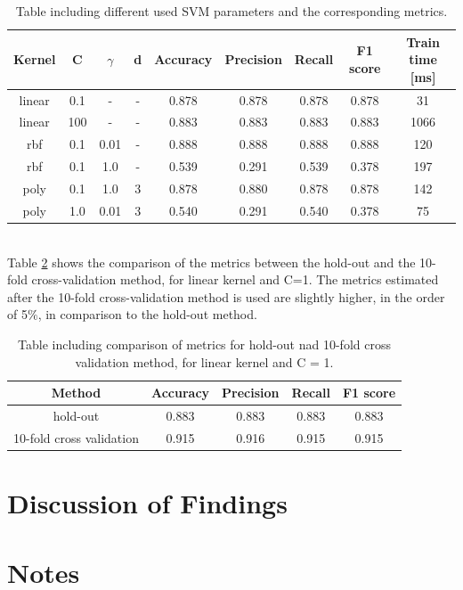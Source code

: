 \documentclass{article}
\begin{document}
\begin{table}[h!]
\centering
\begin{tabular}{||c c c c c c c c c||} 
 \hline
 Kernel & C & $\gamma$ &d & Accuracy & Precision & Recall & F1 score & Train time [ms] \\ [0.5ex] 
 \hline\hline
 linear & 0.1 & - & - & 0.878 & 0.878 & 0.878 & 0.878 & 31 \\
 linear & 100 & - & - & 0.883 & 0.883 & 0.883 & 0.883 & 1066 \\
 rbf & 0.1 & 0.01 &- &  0.888 & 0.888 & 0.888 & 0.888 & 120  \\
 rbf & 0.1 & 1.0 & - & 0.539 & 0.291 & 0.539 & 0.378 & 197 \\
 poly & 0.1 &  1.0 &  3 & 0.878 & 0.880 &  0.878 & 0.878 & 142  \\ 
 poly & 1.0 &  0.01 &  3 & 0.540 & 0.291 &  0.540 & 0.378 & 75  \\[1ex] 
 \hline
\end{tabular}
\caption{Table including different used SVM parameters and the corresponding metrics.}
\label{table:machine_SVM}
\end{table}
\\ 
Table \ref{table:machine_SVM_cross} shows the comparison of the metrics between the hold-out and the 10-fold cross-validation method, for linear kernel and C=1. The metrics estimated after the 10-fold cross-validation method is used are slightly higher, in the order of 5$\%$, in comparison to the hold-out method. 
\begin{table}[h!]
\centering
\begin{tabular}{||c c c c c||} 
 \hline
Method &  Accuracy & Precision & Recall & F1 score \\ [0.5ex] 
 \hline\hline
hold-out & 0.883 & 0.883 & 0.883 & 0.883  \\  
 10-fold cross validation &  0.915&  0.916 & 0.915& 0.915 \\ [1ex] 
 \hline
\end{tabular}
\caption{Table including comparison of metrics for hold-out nad 10-fold cross validation method, for linear kernel and C = 1.}
\label{table:machine_SVM_cross}
\end{table}

\section{Discussion of Findings}



\section{Notes}
\end{document}
